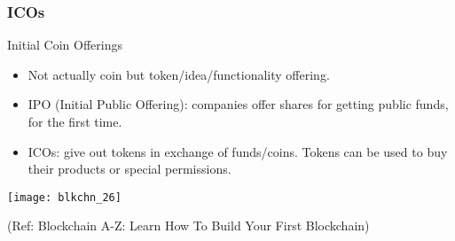 \begin{frame}[fragile]\frametitle{ICOs}
Initial Coin Offerings

\begin{itemize}
\item Not actually coin but token/idea/functionality offering.
\item IPO (Initial Public Offering): companies offer shares for getting public funds, for the first time.
\item ICOs: give out tokens in exchange of funds/coins. Tokens can be used to buy their products or special permissions.
\end{itemize}

\begin{center}
\texttt{[image: blkchn\_26]}

{\tiny (Ref: Blockchain A-Z: Learn How To Build Your First Blockchain)}
\end{center}

\end{frame}




